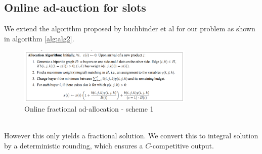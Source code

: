 \subsection{Online ad-auction for slots}\label{sec:alg2}
We extend the algorithm proposed by buchbinder et al \cite{buchbinder2007online} for our problem as shown in algorithm \ref{alg:alg2}.
\begin{figure}[h]
  \centering
  \includegraphics[width=3.3in]{figs/algo2.png}
  \caption{Online fractional ad-allocation - scheme 1}
  \label{fig:algo1}
\end{figure}
\ \\
However this only yields a fractional solution. We convert this to integral solution by a deterministic rounding, which ensures a $C$-competitive output.